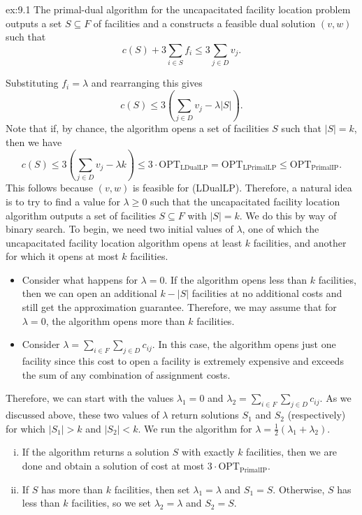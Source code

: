 \begin{exercise}{ex:9.1}
    The primal-dual algorithm for the uncapacitated facility location 
    problem outputs a set $S \subseteq F$ of facilities and a 
    constructs a feasible dual solution $(v, w)$ such that 
    \[ c(S) + 3 \sum_{i\in S} f_i \leq 3 \sum_{j\in D} v_j. \]
\end{exercise}\vspace{-0.25cm}
Substituting $f_i = \lambda$ and rearranging this gives 
\begin{equation}\label{eqn:9.1}
    c(S) \leq 3 \left( \sum_{j\in D} v_j - \lambda|S| \right).
\end{equation}
Note that if, by chance, the algorithm opens a set of facilities $S$ such that 
$|S| = k$, then we have 
\[ c(S) \leq 3\left( \sum_{j\in D} v_j - \lambda k \right) \leq 
3 \cdot \text{OPT}_{\text{LDualLP}} = \text{OPT}_{\text{LPrimalLP}} 
\leq \text{OPT}_{\text{PrimalIP}}. \]
This follows because $(v, w)$ is feasible for (LDualLP). Therefore, 
a natural idea is to try to find a value for $\lambda \geq 0$ such that 
the uncapacitated facility location algorithm outputs a set of 
facilities $S \subseteq F$ with $|S| = k$. We do this by way of 
binary search. To begin, we need two initial values of $\lambda$, one 
of which the uncapacitated facility location algorithm opens 
at least $k$ facilities, and another for which it opens at most $k$ facilities. 
\begin{itemize}
    \item Consider what happens for $\lambda = 0$. If the algorithm 
    opens less than $k$ facilities, then we can open an additional 
    $k - |S|$ facilities at no additional costs and still get the 
    approximation guarantee. Therefore, we may assume that for 
    $\lambda = 0$, the algorithm opens more than $k$ facilities. 
    \item Consider $\lambda = \sum_{i\in F} \sum_{j\in D} c_{ij}$. 
    In this case, the algorithm opens just one facility since 
    this cost to open a facility is extremely expensive and 
    exceeds the sum of any combination of assignment costs. 
\end{itemize}
Therefore, we can start with the values $\lambda_1 = 0$ and 
$\lambda_2 = \sum_{i\in F} \sum_{j\in D} c_{ij}$. As we discussed above, 
these two values of $\lambda$ return solutions $S_1$ and $S_2$ 
(respectively) for which $|S_1| > k$ and $|S_2| < k$. We run the algorithm 
for $\lambda = \frac12(\lambda_1 + \lambda_2)$. 
\begin{enumerate}[(i)]
    \item If the algorithm 
    returns a solution $S$ with exactly $k$ facilities, then we are done 
    and obtain a solution of cost at most $3 \cdot \text{OPT}_{\text{PrimalIP}}$.
    \item If $S$ has more than $k$ facilities, then set $\lambda_1 = \lambda$ 
    and $S_1 = S$. Otherwise, $S$ has less than $k$ facilities, so we set 
    $\lambda_2 = \lambda$ and $S_2 = S$. 
\end{enumerate} 
